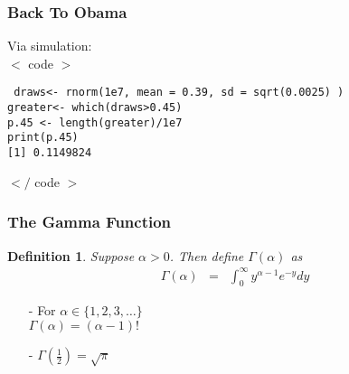 \documentclass{beamer}
\newtheorem{defn}{Definition}
\numberwithin{equation}{section}
\begin{document}
\begin{frame}
\frametitle{Back To Obama } 

Via simulation: \\

$<$ code $>$

{\tt \hspace{0.025in} draws<- rnorm(1e7, mean = 0.39, sd = sqrt(0.0025) ) \\
\hspace{0.025in} greater<- which(draws>0.45) \\
\hspace{0.025in} p.45 <- length(greater)/1e7 \\
\hspace{0.025in} print(p.45) \\
\hspace{0.025in} [1] 0.1149824
}


$</$ code $>$
\end{frame}

\begin{frame}
\frametitle{The Gamma Function}

\begin{defn}
Suppose $\alpha>0$.  Then define $\Gamma(\alpha)$ as 
\begin{eqnarray}
\Gamma(\alpha) & = & \int_{0}^{\infty} y^{\alpha- 1} e^{-y} dy \nonumber 
\end{eqnarray}
\end{defn}

\begin{itemize}
\item[-] For $\alpha \in \{1, 2, 3, \hdots\}$\\
 $\Gamma(\alpha) = (\alpha- 1)!$
\item[-] $\Gamma(\frac{1}{2}) = \sqrt{\pi}$
\end{itemize}


\end{frame}
\end{document}
